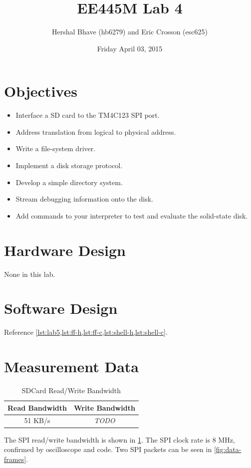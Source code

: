 \documentclass[12pt]{article}
\title{EE445M Lab 4}
\author{Hershal Bhave (hb6279) and Eric Crosson (esc625)}
\date{Friday April 03, 2015}
\newcommand{\todo}{\hfill{\LARGE \emph{\color{red}TODO}}}
\begin{document}
\maketitle

\section{Objectives}
\begin{itemize}

\item Interface a SD card to the TM4C123 SPI port.
\item Address translation from logical to physical address.
\item Write a file-system driver.
\item Implement a disk storage protocol.
\item Develop a simple directory system.
\item Stream debugging information onto the disk.
\item Add commands to your interpreter to test and evaluate the
  solid-state disk.
\end{itemize}

\section{Hardware Design}
None in this lab.

\section{Software Design}
Reference \cref{lst:lab5,lst:ff-h,lst:ff-c,lst:shell-h,lst:shell-c}.

\section{Measurement Data}
\begin{table}
  \centering
  \begin{tabular}{c|c}
    Read Bandwidth & Write Bandwidth \\
    \hline
    51 KB/s & \todo \\
  \end{tabular}
  \caption{SDCard Read/Write Bandwidth}
  \label{tbl:sdcard-bandwidth}
\end{table}

The SPI read/write bandwidth is shown in
\cref{tbl:sdcard-bandwidth}. The SPI clock rate is 8 MHz, confirmed by
oscilloscope and code. Two SPI packets can be seen in
\cref{fig:data-frames}.
\end{document}
